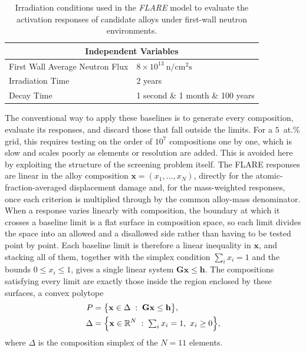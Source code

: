 \begin{table}[H]
\centering
\caption{Irradiation conditions used in the \emph{FLARE} model to evaluate the
activation responses of candidate alloys under first-wall neutron environments.}
\label{tab:ind_variables}
\begin{tabularx}{\columnwidth}{lX}
\toprule
\multicolumn{2}{c}{\textbf{Independent Variables}} \\
\midrule
First Wall Average Neutron Flux & \(8\times10^{13}~\mathrm{n/cm^2 s}\) \\
Irradiation Time               & 2 years \\
Decay Time                     & 1 second \& 1 month \& 100 years \\
\bottomrule
\end{tabularx}
\end{table}

The conventional way to apply these baselines is to generate every composition,
evaluate its responses, and discard those that fall outside the limits. For a
\(5\)~at.\% grid, this requires testing on the order of \(10^{7}\) compositions one
by one, which is slow and scales poorly as elements or resolution are added. This
is avoided here by exploiting the structure of the screening problem itself. The
FLARE responses are linear in the alloy composition
\(\mathbf{x}=(x_1,\dots,x_N)\), directly for the atomic-fraction-averaged
displacement damage and, for the mass-weighted responses, once each criterion is
multiplied through by the common alloy-mass denominator. When a response varies
linearly with composition, the boundary at which it crosses a baseline limit is a
flat surface in composition space, so each limit divides the space into an allowed
and a disallowed side rather than having to be tested point by point. Each baseline
limit is therefore a linear inequality in \(\mathbf{x}\), and stacking all of them,
together with the simplex condition \(\sum_i x_i = 1\) and the bounds
\(0 \le x_i \le 1\), gives a single linear system
\(\mathbf{G}\mathbf{x} \le \mathbf{h}\). The compositions satisfying every limit
are exactly those inside the region enclosed by these surfaces, a convex polytope
\begin{equation}
\begin{aligned}
P &= \bigl\{\mathbf{x}\in\Delta \;:\; \mathbf{G}\mathbf{x}\le\mathbf{h}\bigr\},\\
\Delta &= \Bigl\{\mathbf{x}\in\mathbb{R}^{N} \;:\; \textstyle\sum_{i} x_i = 1,\ x_i \ge 0\Bigr\},
\end{aligned}
\label{eq:polytope}
\end{equation}
where \(\Delta\) is the composition simplex of the \(N=11\) elements.

